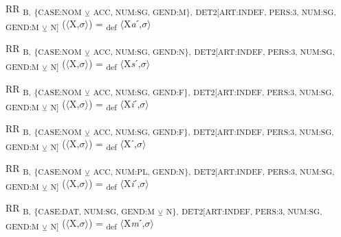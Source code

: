{\begin{exe}
 RR \textsubscript{B,} \textsubscript{\{CASE:NOM} \textsubscript{${\veebar}$}\textsubscript{ ACC, NUM:SG, GEND:M\},} \textsubscript{DET2[ART:INDEF, PERS:3, NUM:SG, GEND:M} \textsubscript{${\veebar}$}\textsubscript{ N]} ($\langle$X,$\sigma $$\rangle$) = \textsubscript{def} $\langle$X\textit{a}ˊ,$\sigma $$\rangle$
\end{exe}

\begin{exe}
 RR \textsubscript{B,} \textsubscript{\{CASE:NOM} \textsubscript{${\veebar}$}\textsubscript{ ACC, NUM:SG, GEND:N\},} \textsubscript{DET2[ART:INDEF, PERS:3, NUM:SG, GEND:M} \textsubscript{${\veebar}$}\textsubscript{ N]} ($\langle$X,$\sigma $$\rangle$) = \textsubscript{def} $\langle$X\textit{s}ˊ,$\sigma $$\rangle$
\end{exe}

\begin{exe}
 RR \textsubscript{B,} \textsubscript{\{CASE:NOM} \textsubscript{${\veebar}$}\textsubscript{ ACC, NUM:SG, GEND:F\},} \textsubscript{DET2[ART:INDEF, PERS:3, NUM:SG, GEND:M} \textsubscript{${\veebar}$}\textsubscript{ N]} ($\langle$X,$\sigma $$\rangle$) = \textsubscript{def} $\langle$X\textit{i}ˊ,$\sigma $$\rangle$
\end{exe}

\begin{exe}
 RR \textsubscript{B,} \textsubscript{\{CASE:NOM} \textsubscript{${\veebar}$}\textsubscript{ ACC, NUM:SG, GEND:F\},} \textsubscript{DET2[ART:INDEF, PERS:3, NUM:SG, GEND:M} \textsubscript{${\veebar}$}\textsubscript{ N]} ($\langle$X,$\sigma $$\rangle$) = \textsubscript{def} $\langle$Xˊ,$\sigma $$\rangle$
\end{exe}

\begin{exe}
 RR \textsubscript{B,} \textsubscript{\{CASE:NOM} \textsubscript{${\veebar}$}\textsubscript{ ACC, NUM:PL, GEND:N\},} \textsubscript{DET2[ART:INDEF, PERS:3, NUM:SG, GEND:M} \textsubscript{${\veebar}$}\textsubscript{ N]} ($\langle$X,$\sigma $$\rangle$) = \textsubscript{def} $\langle$X\textit{i}ˊ,$\sigma $$\rangle$
\end{exe}

\begin{exe}
 RR \textsubscript{B,} \textsubscript{\{CASE:DAT, NUM:SG, GEND:M} \textsubscript{${\veebar}$}\textsubscript{ N\},} \textsubscript{DET2[ART:INDEF, PERS:3, NUM:SG, GEND:M} \textsubscript{${\veebar}$}\textsubscript{ N]} ($\langle$X,$\sigma $$\rangle$) = \textsubscript{def} $\langle$X\textit{m}ˊ,$\sigma $$\rangle$
\end{exe}

}
